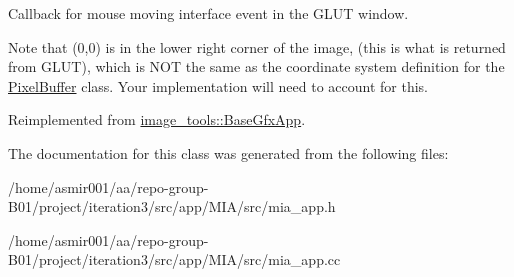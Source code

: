 Callback for mouse moving interface event in the G\+L\+UT window. 

Note that (0,0) is in the lower right corner of the image, (this is what is returned from G\+L\+UT), which is N\+OT the same as the coordinate system definition for the \hyperlink{classimage__tools_1_1PixelBuffer}{Pixel\+Buffer} class. Your implementation will need to account for this. 

Reimplemented from \hyperlink{classimage__tools_1_1BaseGfxApp_ab2aa4111469862051287ba2b9983224d}{image\+\_\+tools\+::\+Base\+Gfx\+App}.



The documentation for this class was generated from the following files\+:\begin{DoxyCompactItemize}
\item 
/home/asmir001/aa/repo-\/group-\/\+B01/project/iteration3/src/app/\+M\+I\+A/src/mia\+\_\+app.\+h\item 
/home/asmir001/aa/repo-\/group-\/\+B01/project/iteration3/src/app/\+M\+I\+A/src/mia\+\_\+app.\+cc\end{DoxyCompactItemize}
